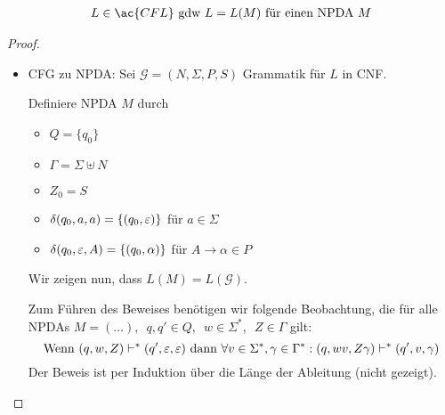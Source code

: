 \begin{Satz}\label{satz:5.1}
  \begin{align*}
                L \in \ac{CFL}  \text{ gdw } L =L(M) \text{ für einen NPDA $M$}
  \end{align*}
\end{Satz}
\begin{proof}\hfill
        \begin{itemize}
        \item CFG zu NPDA:
                Sei $\mathcal{G} = (N,\Sigma,P,S)$ Grammatik für $L$ in \ac{CNF}.
    
                Definiere \ac{NPDA} $M$ durch
                \begin{itemize}
                        \item $Q = \{q_0\}$ 
                        \item $\Gamma = \Sigma\uplus N$
                        \item $Z_0 = S$
                        \item $\delta(q_0,a,a) = \{(q_0,\varepsilon)\} $ für $ a\in\Sigma$
                        \item $\delta(q_0,\varepsilon,A) = \{(q_0,\alpha)\}$ für $A\to\alpha\in P$
                \end{itemize}
  Wir zeigen nun, dass $L(M) = L(\mathcal{G})$.

  Zum Führen des Beweises benötigen wir folgende Beobachtung, die für alle NPDAs $M = (\ldots),\enspace q,q' \in Q,\enspace w \in \Sigma^*,\enspace Z \in \Gamma$ gilt:
  \begin{displaymath}
    \text{Wenn } (q,w,Z) \vdash^* (q', \varepsilon, \varepsilon) \text{ dann } \forall v \in \Sigma^*, \gamma \in \Gamma^*: (q, wv, Z\gamma) \vdash^* (q', v, \gamma)
  \end{displaymath}
  Der Beweis ist per Induktion über die Länge der Ableitung (nicht gezeigt).


\end{itemize}
\end{proof}
